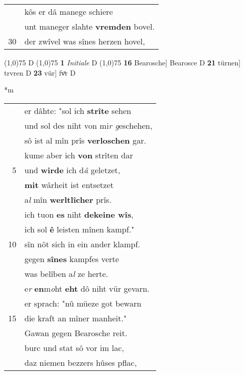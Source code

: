 \documentclass[8pt,a4paper,notitlepage]{article}
\begin{document}
\begin{table}[ht]
\begin{minipage}[t]{0.5\linewidth}
\begin{tabular}{rl}
 & kôs er dâ manege schiere\\ 
 & unt maneger slahte \textbf{vremden} bovel.\\ 
30 & der zwîvel was sînes herzen hovel,\\ 
\end{tabular}
\scriptsize
\line(1,0){75} \newline
D \newline
\line(1,0){75} \newline
\textbf{1} \textit{Initiale} D  \newline
\line(1,0){75} \newline
\textbf{16} Bearosche] Bearosce D \textbf{21} türnen] trvren D \textbf{23} vür] fvͦr D \newline
\end{minipage}
\hspace{0.5cm}
\begin{minipage}[t]{0.5\linewidth}
\small
\begin{center}*m
\end{center}
\begin{tabular}{rl}
 & er dâhte: "sol ich \textbf{strîte} sehen\\ 
 & und sol des niht von mi\textit{r g}eschehen,\\ 
 & sô ist al mîn prîs \textbf{verloschen} gar.\\ 
 & kume aber ich \textbf{von} strîten dar\\ 
5 & und \textbf{wirde} ich d\textit{â} geletzet,\\ 
 & \textbf{mit} wârheit ist entsetzet\\ 
 & a\textit{l} mîn \textbf{werltlîcher} prîs.\\ 
 & ich tuon \textbf{es} niht \textbf{dekeine wîs},\\ 
 & ich sol \textbf{ê} leisten mînen kampf."\\ 
10 & sîn nôt sich in ein ander klampf.\\ 
 & gegen \textbf{sînes} kampfes verte\\ 
 & was belîben a\textit{l} ze herte.\\ 
 & e\textit{r} \textbf{en}m\textit{o}ht \textbf{eht} dô niht vür gevarn.\\ 
 & er sprach: "nû müeze got bewarn\\ 
15 & die kraft an mîner manheit."\\ 
 & Gawan gegen Bearosche reit.\\ 
 & burc und stat sô vor im lac,\\ 
 & daz niemen bezzers hûses pflac,\\ 

\end{tabular}
\end{minipage}
\end{table}
\end{document}
